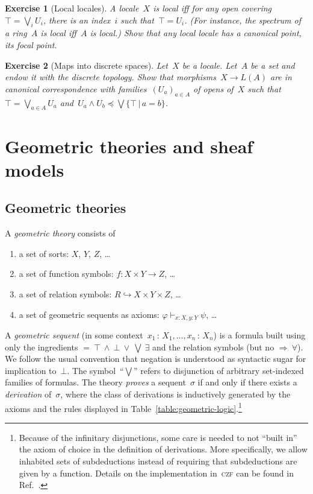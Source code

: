 \documentclass{ws-rv9x6}
\newtheorem{ex}{Exercise}
\newenvironment{exercise}[1]{
  \begin{ex}[#1]
}{\end{ex}}
\renewcommand{\_}{\mathpunct{.}}
\newcommand{\?}{\,{:}\,}
\begin{document}
\begin{exercise}{Local locales}%
\label{ex:local-locales}%
A locale~$X$ is \emph{local} iff for any open covering~$\top = \bigvee_i U_i$,
there is an index~$i$ such that~$\top = U_i$. (For instance, the spectrum of a
ring~$A$ is local iff~$A$ is local.)
Show that any local locale has a canonical point, its \emph{focal point}.
\end{exercise}

\begin{exercise}{Maps into discrete spaces}%
Let~$X$ be a locale. Let~$A$ be a set and endow it with the discrete topology. Show
that morphisms~$X \to L(A)$ are in canonical correspondence with
families~$(U_a)_{a \in A}$ of opens of~$X$ such that~$\top = \bigvee_{a \in A}
U_a$ and~$U_a \wedge U_b \preceq \bigvee\{ \top \,|\, a = b \}$.
\end{exercise}


\section{Geometric theories and sheaf models}

\subsection{Geometric theories}
\label{sect:geometric-theories}

\begin{definition}A \emph{geometric theory} consists of
\begin{enumerate}
  \item a set of sorts: $X$, $Y$, $Z$, \ldots
  \item a set of function symbols: $f : X \times Y \to Z$, \ldots
  \item a set of relation symbols: $R \hookrightarrow X \times Y \times Z$, \ldots
  \item a set of geometric sequents as axioms: $\varphi \vdash_{x:X, y:Y} \psi$, \ldots
\end{enumerate}
A \emph{geometric sequent} (in some context~$x_1\?X_1,\ldots,x_n\?X_n$) is a
formula built using only the ingredients ${=}\ {\top}\ {\wedge}\ {\bot}\
{\vee}\ {\bigvee}\ {\exists}$ and the relation symbols (but no ${\Rightarrow}\
{\forall}$). We follow the usual convention that negation is understood as
syntactic sugar for implication to~$\bot$. The symbol~``$\bigvee$'' refers to disjunction of arbitrary
set-indexed families of formulas. The theory \emph{proves} a sequent~$\sigma$ if and
only if there exists a \emph{derivation} of~$\sigma$, where the class of
derivations is inductively generated by the axioms and the rules displayed in
Table~\ref{table:geometric-logic}.\footnote{Because of the infinitary
disjunctions, some care is needed to not ``built in'' the axiom of choice in
the definition of derivations. More specifically, we allow inhabited sets of
subdeductions instead of requiring that subdeductions are given by a function.
Details on the implementation in~\textsc{czf} can be found in
Ref.~\cite[Definition~5.2]{rathjen:barr}.}
\end{definition}
\end{document}
